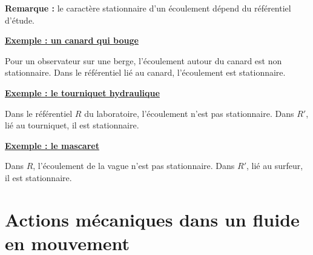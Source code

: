 \documentclass[11pt,a4paper]{article}
\newcommand{\vv}{\vec v}
\newcommand{\titr}[1]{\par\needspace{4\baselineskip}\textbf{\underline{#1}}\par}
\newcommand{\repere}[1]{\draw[->] (0,0)--(.8,0);\draw[->] (0,0)--(0,.8);\draw[->] (0,0)--(-.45,-.5);\node[below right] at (.15,-.1){$#1$};}
\begin{document}
\textbf{Remarque :} le caractère stationnaire d'un écoulement dépend du référentiel d'étude.
\begin{exemple}
\titr{Exemple : un canard qui bouge}
Pour un observateur sur une berge, l'écoulement autour du canard est non stationnaire. Dans le référentiel lié au canard, l'écoulement est stationnaire.
\end{exemple}
\begin{exemple}
\titr{Exemple : le tourniquet hydraulique}
\begin{minipage}{.27\linewidth}\centering
{}
\end{minipage}\hfill\begin{minipage}{.7\linewidth}
Dans le référentiel $R$ du laboratoire, l'écoulement n'est pas stationnaire. Dans $R'$, lié au tourniquet, il est stationnaire.
\end{minipage}
\end{exemple}
\begin{exemple}
\titr{Exemple : le mascaret}
\begin{minipage}{.35\linewidth}\centering{}\end{minipage}\hfill\begin{minipage}{.62\linewidth}
Dans $R$, l'écoulement de la vague n'est pas stationnaire. Dans $R'$, lié au surfeur, il est stationnaire.
\end{minipage}
\end{exemple}
\section{Actions mécaniques dans un fluide en mouvement}
\end{document}
